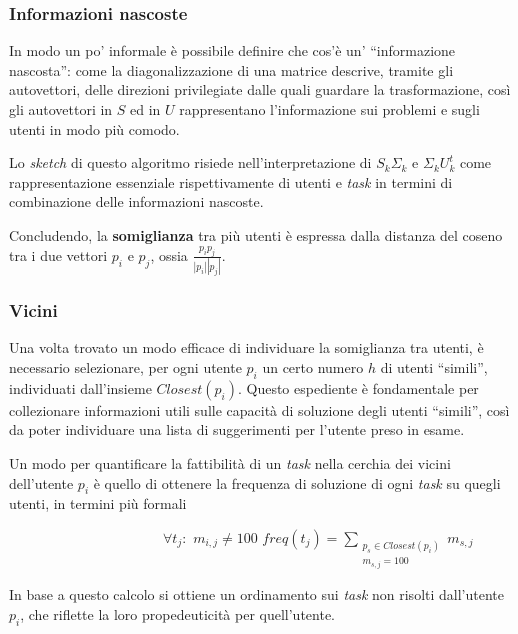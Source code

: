 \documentclass[12pt,a4paper]{article}
\theoremstyle{thm}
\theoremstyle{def}
\begin{document}

\subsubsection{Informazioni nascoste}
\label{sym}
In modo un po' informale è possibile definire che cos'è un' ``informazione nascosta'': come la diagonalizzazione di una matrice descrive, tramite gli autovettori, delle direzioni privilegiate dalle quali guardare la trasformazione, così gli autovettori in $S$ ed in $U$ rappresentano l'informazione sui problemi e  sugli utenti in modo più comodo.

Lo \textit{sketch} di questo algoritmo risiede nell'interpretazione di $S_k \Sigma_ k$ e $\Sigma_k U_k^t$ come rappresentazione essenziale rispettivamente di utenti e \textit{task} in termini di combinazione delle informazioni nascoste.

Concludendo, la \textbf{somiglianza} tra più utenti è espressa dalla distanza del coseno tra i due vettori $p_i$ e $p_j$, ossia $\frac{p_i p_j}{|p_i||p_j|}$.


\subsubsection{Vicini}
\label{ilCento}
Una volta trovato un modo efficace di individuare la somiglianza tra utenti, è necessario selezionare, per ogni utente $p_i$ un certo numero $h$ di utenti ``simili'', individuati dall'insieme $Closest(p_i)$. Questo espediente è fondamentale per collezionare informazioni utili sulle capacità di soluzione degli utenti ``simili'', così da poter individuare una lista di suggerimenti per l'utente preso in esame.

Un modo per quantificare la fattibilità di un \textit{task} nella cerchia dei vicini dell'utente $p_i$ è quello di ottenere la frequenza di soluzione di ogni \textit{task} su quegli utenti, in termini più formali

~~~~~~~~~~~~~~~~~~~~~~$\forall t_j :$ $m_{i,j} \neq 100$ $freq(t_j) = \sum\limits_{\substack{p_s \in Closest(p_i) \\ m_{s,j} = 100}} m_{s,j}$ 

In base a questo calcolo si ottiene un ordinamento sui \textit{task} non risolti dall'utente $p_i$, che riflette la loro propedeuticità per quell'utente.

\end{document}
